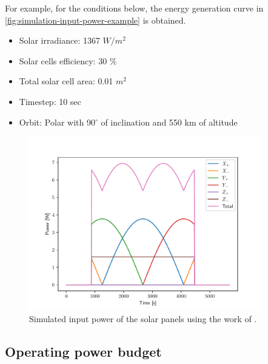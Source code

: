 For example, for the conditions below, the energy generation curve in \autoref{fig:simulation-input-power-example} is obtained.

\begin{itemize}
    \item Solar irradiance: 1367 $W/m^{2}$
    \item Solar cells efficiency: 30 \%
    \item Total solar cell area: 0.01 $m^{2}$
    \item Timestep: 10 sec
    \item Orbit: Polar with 90$^{\circ}$ of inclination and 550 km of altitude
\end{itemize}

\begin{figure}[!ht]
    \begin{center}
        \includegraphics[width=0.9\textwidth]{figures/sim-input-power-3u}
        \caption{Simulated input power of the solar panels using the work of \cite{rigo2023}.}
        \label{fig:simulation-input-power-example}
    \end{center}
\end{figure}

\subsection{Operating power budget}


